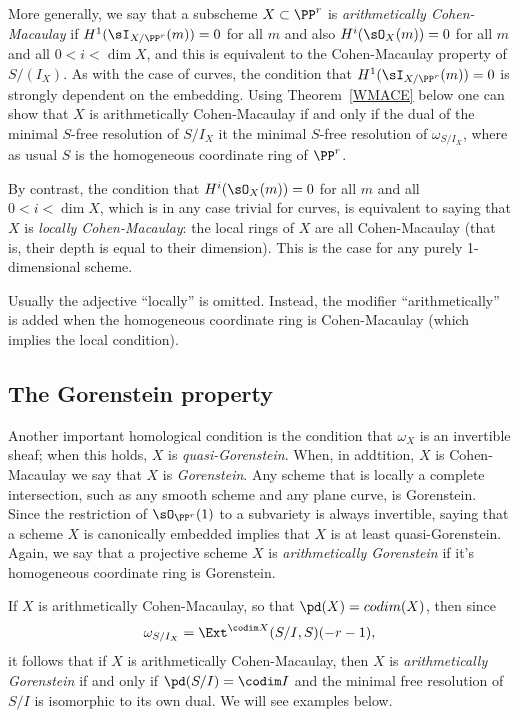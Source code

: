 More generally, we say that a subscheme $X\subset \PP^r$ is \emph{arithmetically Cohen-Macaulay}
if $H^1(\sI_{X/\PP^r}(m)) = 0$ for all $m$ and also $H^i(\sO_X(m)) = 0$ for all $m$ and all $0<i<\dim X$,
and this is equivalent to the Cohen-Macaulay property of $S/(I_X)$. As with the case of curves,
the condition that $H^1(\sI_{X/\PP^r}(m)) = 0$ 
is strongly dependent on the embedding. Using Theorem~\ref{WMACE} below one can show
that $X$ is arithmetically Cohen-Macaulay if and only if the dual of the minimal $S$-free resolution
of $S/I_X$ it the minimal $S$-free resolution of $\omega_{S/I_X}$, where as usual $S$ is the
homogeneous coordinate ring of $\PP^r$.

By contrast, the condition
that $H^i(\sO_X(m)) = 0$ for all $m$ and all $0<i<\dim X$, which is in any case trivial for curves, is 
equivalent to saying that $X$ is \emph{locally Cohen-Macaulay}: the local rings of $X$ are all Cohen-Macaulay (that is, their depth is equal to their dimension). This is the case for any purely 1-dimensional scheme. 

Usually the adjective ``locally'' is omitted. Instead, the 
modifier ``arithmetically'' is added when the homogeneous coordinate ring is Cohen-Macaulay (which implies the local condition).

\subsection{The Gorenstein property} 
Another important homological condition is the condition that $\omega_X$ is an invertible sheaf; when this holds, $X$ is \emph{quasi-Gorenstein}. When, in addtition, $X$ is Cohen-Macaulay we say that $X$ is \emph{Gorenstein}. Any scheme that is locally a complete intersection, such as any smooth scheme and any plane curve, is Gorenstein. Since the restriction
of $\sO_{\PP^r}(1)$ to a subvariety is always invertible, saying that a scheme $X$ is canonically embedded implies that
$X$ is at least quasi-Gorenstein. Again, we say that a projective scheme $X$ is \emph{arithmetically Gorenstein}
if it's homogeneous coordinate ring is Gorenstein. 

If $X$ is arithmetically Cohen-Macaulay, so that
$\pd(X) = codim(X)$,  then since 
$$
\omega_{S/I_X} = \Ext^{\codim X}(S/I, S)(-r-1),
$$
it follows that if $X$ is arithmetically Cohen-Macaulay, then $X$ is  \emph{arithmetically Gorenstein} if and only if
$\pd(S/I) = \codim I$ and the  minimal free resolution of $S/I$ is isomorphic to its own dual. We will see examples
below.

